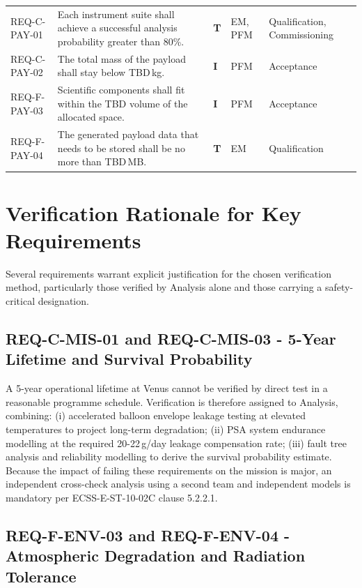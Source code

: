 {\begin{longtable}{p{2.85cm} p{6.2cm} p{1.2cm} p{1.6cm} p{1.8cm}}
REQ-C-PAY-01 & Each instrument suite shall achieve a successful analysis probability greater than 80\%. & \textbf{T} & EM, PFM & Qualification, Commissioning \\
REQ-C-PAY-02 & The total mass of the payload shall stay below TBD\,kg. & \textbf{I} & PFM & Acceptance \\
REQ-F-PAY-03 & Scientific components shall fit within the TBD volume of the allocated space. & \textbf{I} & PFM & Acceptance \\
REQ-F-PAY-04 & The generated payload data that needs to be stored shall be no more than TBD\,MB. & \textbf{T} & EM & Qualification \\

\end{longtable}
}

\section{Verification Rationale for Key Requirements}

Several requirements warrant explicit justification for the chosen verification method, particularly those verified by Analysis alone and those carrying a safety-critical designation.

\subsection{REQ-C-MIS-01 and REQ-C-MIS-03 - 5-Year Lifetime and Survival Probability}

A 5-year operational lifetime at Venus cannot be verified by direct test in a reasonable programme schedule. Verification is therefore assigned to Analysis, combining: (i) accelerated balloon envelope leakage testing at elevated temperatures to project long-term degradation; (ii) PSA system endurance modelling at the required 20-22\,g/day leakage compensation rate; (iii) fault tree analysis and reliability modelling to derive the survival probability estimate. Because the impact of failing these requirements on the mission is major, an independent cross-check analysis using a second team and independent models is mandatory per ECSS-E-ST-10-02C clause 5.2.2.1.

\subsection{REQ-F-ENV-03 and REQ-F-ENV-04 - Atmospheric Degradation and Radiation Tolerance}

